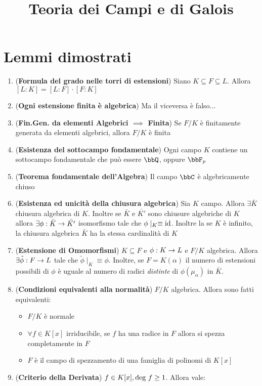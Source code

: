 \documentclass[a4paper,NoNotes,GeneralMath]{stdmdoc}
\begin{document}
	\title{Teoria dei Campi e di Galois}

	\section*{Lemmi dimostrati}
	\begin{enumerate}
		\item ({\bf Formula del grado nelle torri di estensioni}) Siano $K \subseteq F \subseteq L$. Allora $[L:K] = [L:F] \cdot [F:K]$
		\item ({\bf Ogni estensione finita è algebrica}) Ma il viceversa è falso...
		\item ({\bf Fin.Gen. da elementi Algebrici $\implies$ Finita}) Se $F/K$ è finitamente generata da elementi algebrici, allora $F/K$ è finita
		\item ({\bf Esistenza del sottocampo fondamentale}) Ogni campo $K$ contiene un sottocampo fondamentale che può essere $\bbQ$, oppure $\bbF_p$
		\item ({\bf Teorema fondamentale dell'Algebra}) Il campo $\bbC$ è algebricamente chiuso
		\item ({\bf Esistenza ed unicità della chiusura algebrica}) Sia $K$ campo. Allora $\exists \bar{K}$ chiusura algebrica di $K$. Inoltre se $\bar{K}$ e $\bar{K'}$ sono chiusure algebriche di $K$ allora $\exists \phi: \bar{K} \rightarrow \bar{K'}$ isomorfismo tale che $\phi \mid_K \equiv \mbox{id}$. Inoltre la se $K$ è infinito, la chiusura algebrica $\bar{K}$ ha la stessa cardinalità di $K$
		\item ({\bf Estensione di Omomorfismi}) $K \subseteq F$ e $\phi: K \rightarrow L$ e $F/K$ algebrica. Allora $\exists \tilde{\phi}: F \rightarrow L$ tale che $\tilde{\phi}\mid_K \equiv \phi$. Inoltre, se $F = K(\alpha)$ il numero di estensioni possibili di $\phi$ è uguale al numero di radici {\it distinte} di $\phi(\mu_\alpha)$ in $\bar{K}$.
		\item ({\bf Condizioni equivalenti alla normalità}) $F/K$ algebrica. Allora sono fatti equivalenti: \\
			\begin{itemize}
				\item $F/K$ è normale
				\item $\forall f \in K[x]$ irriducibile, se $f$ ha una radice in $F$ allora si spezza completamente in $F$
				\item $F$ è il campo di spezzamento di una famiglia di polinomi di $K[x]$
			\end{itemize}
		\item ({\bf Criterio della Derivata}) $f \in K[x], \mbox{deg } f \ge 1$. Allora vale: \\

\end{enumerate}
\end{document}
